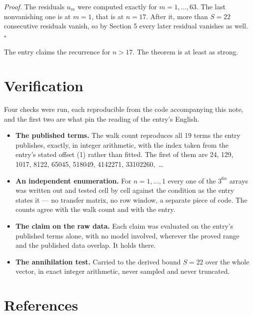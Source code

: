 \documentclass[11pt]{article}
\theoremstyle{definition}
\begin{document}
{\itshape Proof.} The residuals $u_m$ were computed exactly for $m = 1,\dots,63$. The last nonvanishing one is at $m = 1$, that is at $n = 17$. After it, more than $S = 22$ consecutive residuals vanish, so by Section 5 every later residual vanishes as well. $\square$

The entry claims the recurrence for $n > 17$. The theorem is at least as strong.

\section{Verification}

Four checks were run, each reproducible from the code accompanying this note, and the first two are what pin the reading of the entry's English.

\begin{itemize}

\item {\bfseries The published terms.} The walk count reproduces all 19 terms the entry publishes, exactly, in integer arithmetic, with the index taken from the entry's stated offset (1) rather than fitted. The first of them are 24, 129, 1017, 8122, 65045, 518049, 4142271, 33102260,~\dots

\item {\bfseries An independent enumeration.} For $n = 1,\dots,1$ every one of the $3^{6n}$ arrays was written out and tested cell by cell against the condition as the entry states it --- no transfer matrix, no row window, a separate piece of code. The counts agree with the walk count and with the entry.

\item {\bfseries The claim on the raw data.} Each claim was evaluated on the entry's published terms alone, with no model involved, wherever the proved range and the published data overlap. It holds there.

\item {\bfseries The annihilation test.} Carried to the derived bound $S = 22$ over the whole vector, in exact integer arithmetic, never sampled and never truncated.

\end{itemize}

\section{References}
\end{document}
